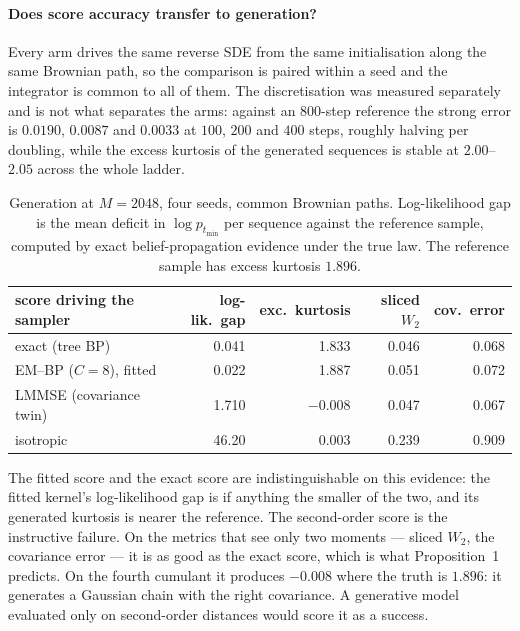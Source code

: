 \documentclass[11pt,a4paper]{article}
\begin{document}
\paragraph{Does score accuracy transfer to generation?}
Every arm drives the same reverse SDE from the same initialisation along the same Brownian path, so
the comparison is paired within a seed and the integrator is common to all of them. The
discretisation was measured separately and is not what separates the arms: against an $800$-step
reference the strong error is $0.0190$, $0.0087$ and $0.0033$ at $100$, $200$ and $400$ steps,
roughly halving per doubling, while the excess kurtosis of the generated sequences is stable at
$2.00$--$2.05$ across the whole ladder.

\begin{table}[htbp]
\centering
\small
\caption{Generation at $M=2048$, four seeds, common Brownian paths. Log-likelihood gap is the mean
deficit in $\log p_{t_{\min}}$ per sequence against the reference sample, computed by exact
belief-propagation evidence under the true law. The reference sample has excess kurtosis $1.896$.}
\label{tab:generation}
\begin{tabular}{l dd dd}
\toprule
score driving the sampler & log-lik.\ gap & exc.\ kurtosis & sliced $W_2$ & cov.\ error \\
\midrule
exact (tree BP)              & 0.041  & 1.833  & 0.046 & 0.068 \\
EM--BP ($C=8$), fitted       & 0.022  & 1.887  & 0.051 & 0.072 \\
LMMSE (covariance twin)      & 1.710  & $-0.008$ & 0.047 & 0.067 \\
isotropic                    & 46.20  & 0.003  & 0.239 & 0.909 \\
\bottomrule
\end{tabular}
\end{table}

The fitted score and the exact score are indistinguishable on this evidence: the fitted kernel's
log-likelihood gap is if anything the smaller of the two, and its generated kurtosis is nearer the
reference. The second-order score is the instructive failure. On the metrics that see only two
moments --- sliced $W_2$, the covariance error --- it is as good as the exact score, which is what
Proposition~1 predicts. On the fourth cumulant it produces $-0.008$ where the truth is $1.896$: it
generates a Gaussian chain with the right covariance. A generative model evaluated only on
second-order distances would score it as a success.
\end{document}
